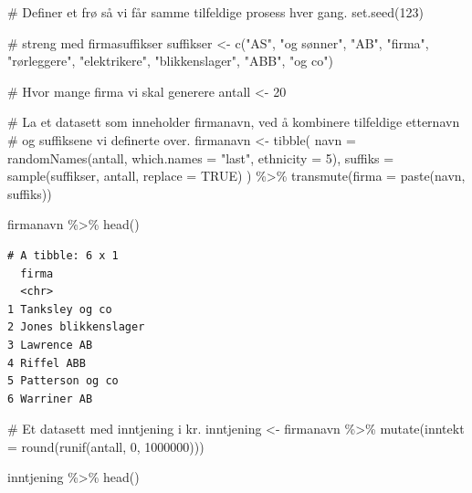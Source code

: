 \documentclass[
  letterpaper,
  DIV=11,
  numbers=noendperiod]{scrreprt}
\newenvironment{Shaded}{\begin{snugshade}}{\end{snugshade}}
\newcommand{\AttributeTok}[1]{\textcolor[rgb]{0.40,0.45,0.13}{#1}}
\newcommand{\CommentTok}[1]{\textcolor[rgb]{0.37,0.37,0.37}{#1}}
\newcommand{\ConstantTok}[1]{\textcolor[rgb]{0.56,0.35,0.01}{#1}}
\newcommand{\DecValTok}[1]{\textcolor[rgb]{0.68,0.00,0.00}{#1}}
\newcommand{\FunctionTok}[1]{\textcolor[rgb]{0.28,0.35,0.67}{#1}}
\newcommand{\NormalTok}[1]{\textcolor[rgb]{0.00,0.23,0.31}{#1}}
\newcommand{\OtherTok}[1]{\textcolor[rgb]{0.00,0.23,0.31}{#1}}
\newcommand{\SpecialCharTok}[1]{\textcolor[rgb]{0.37,0.37,0.37}{#1}}
\newcommand{\StringTok}[1]{\textcolor[rgb]{0.13,0.47,0.30}{#1}}
\begin{document}
\begin{Shaded}
\begin{Highlighting}[]
\CommentTok{\# Definer et frø så vi får samme tilfeldige prosess hver gang.}
\FunctionTok{set.seed}\NormalTok{(}\DecValTok{123}\NormalTok{)}

\CommentTok{\# streng med firmasuffikser}
\NormalTok{suffikser }\OtherTok{\textless{}{-}} \FunctionTok{c}\NormalTok{(}\StringTok{"AS"}\NormalTok{, }\StringTok{"og sønner"}\NormalTok{, }\StringTok{"AB"}\NormalTok{, }\StringTok{"firma"}\NormalTok{, }\StringTok{"rørleggere"}\NormalTok{, }\StringTok{"elektrikere"}\NormalTok{, }\StringTok{"blikkenslager"}\NormalTok{, }\StringTok{"ABB"}\NormalTok{, }\StringTok{"og co"}\NormalTok{)}

\CommentTok{\# Hvor mange firma vi skal generere}
\NormalTok{antall }\OtherTok{\textless{}{-}} \DecValTok{20}

\CommentTok{\# La et datasett som inneholder firmanavn, ved å kombinere tilfeldige etternavn}
\CommentTok{\# og suffiksene vi definerte over.}
\NormalTok{firmanavn }\OtherTok{\textless{}{-}} \FunctionTok{tibble}\NormalTok{(}
  \AttributeTok{navn =} \FunctionTok{randomNames}\NormalTok{(antall, }\AttributeTok{which.names =} \StringTok{"last"}\NormalTok{, }\AttributeTok{ethnicity =} \DecValTok{5}\NormalTok{),}
  \AttributeTok{suffiks =} \FunctionTok{sample}\NormalTok{(suffikser, antall, }\AttributeTok{replace =} \ConstantTok{TRUE}\NormalTok{)}
\NormalTok{) }\SpecialCharTok{\%\textgreater{}\%} 
  \FunctionTok{transmute}\NormalTok{(}\AttributeTok{firma =} \FunctionTok{paste}\NormalTok{(navn, suffiks))}

\NormalTok{firmanavn }\SpecialCharTok{\%\textgreater{}\%} \FunctionTok{head}\NormalTok{()}
\end{Highlighting}
\end{Shaded}

\begin{verbatim}
# A tibble: 6 x 1
  firma              
  <chr>              
1 Tanksley og co     
2 Jones blikkenslager
3 Lawrence AB        
4 Riffel ABB         
5 Patterson og co    
6 Warriner AB        
\end{verbatim}

\begin{Shaded}
\begin{Highlighting}[]
\CommentTok{\# Et datasett med inntjening i kr.}
\NormalTok{inntjening }\OtherTok{\textless{}{-}}\NormalTok{ firmanavn }\SpecialCharTok{\%\textgreater{}\%} 
  \FunctionTok{mutate}\NormalTok{(}\AttributeTok{inntekt =} \FunctionTok{round}\NormalTok{(}\FunctionTok{runif}\NormalTok{(antall, }\DecValTok{0}\NormalTok{, }\DecValTok{1000000}\NormalTok{)))}

\NormalTok{inntjening }\SpecialCharTok{\%\textgreater{}\%} \FunctionTok{head}\NormalTok{()}
\end{Highlighting}
\end{Shaded}
\end{document}
